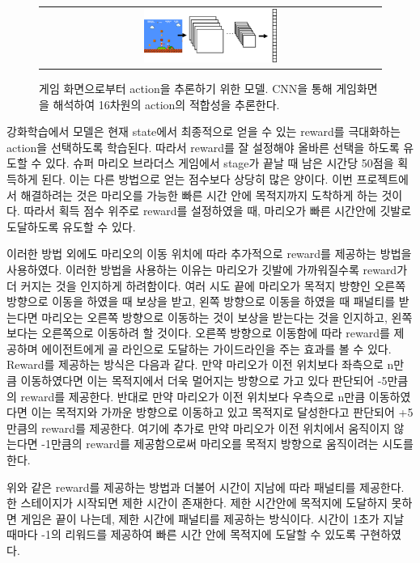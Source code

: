 \begin{figure}[]
\begin{center}
\begin{tabular}{c}
     \includegraphics[width=0.4\textwidth]{FIG/overview.pdf} \\
\end{tabular}
\caption{
	게임 화면으로부터 action을 추론하기 위한 모델. CNN을 통해 게임화면을 해석하여 16차원의 action의 적합성을 추론한다.
}
\label{fig:overview}
\end{center}
\end{figure}

강화학습에서 모델은 현재 state에서 최종적으로 얻을 수 있는 reward를 극대화하는 action을 선택하도록 학습된다.
따라서 reward를 잘 설정해야 올바른 선택을 하도록 유도할 수 있다.
슈퍼 마리오 브라더스 게임에서 stage가 끝날 때 남은 시간당 50점을 획득하게 된다.
이는 다른 방법으로 얻는 점수보다 상당히 많은 양이다.
이번 프로젝트에서 해결하려는 것은 마리오를 가능한 빠른 시간 안에 목적지까지 도착하게 하는 것이다. 
따라서 획득 점수 위주로 reward를 설정하였을 때, 마리오가 빠른 시간안에 깃발로 도달하도록 유도할 수 있다.




이러한 방법 외에도 마리오의 이동 위치에 따라 추가적으로 reward를 제공하는 방법을 사용하였다. 
이러한 방법을 사용하는 이유는 마리오가 깃발에 가까워질수록 reward가 더 커지는 것을 인지하게 하려함이다. 
여러 시도 끝에 마리오가 목적지 방향인 오른쪽 방향으로 이동을 하였을 때 보상을 받고, 왼쪽 방향으로 이동을 하였을 때 패널티를 받는다면 마리오는 오른쪽 방향으로 이동하는 것이 보상을 받는다는 것을 인지하고, 왼쪽보다는 오른쪽으로 이동하려 할 것이다.
오른쪽 방향으로 이동함에 따라 reward를 제공하며 에이전트에게 골 라인으로 도달하는 가이드라인을 주는 효과를 볼 수 있다.
Reward를 제공하는 방식은 다음과 같다.
만약 마리오가 이전 위치보다 좌측으로 n만큼 이동하였다면 이는 목적지에서 더욱 멀어지는 방향으로 가고 있다 판단되어 -5만큼의 reward를 제공한다. 
반대로 만약 마리오가 이전 위치보다 우측으로 n만큼 이동하였다면 이는 목적지와 가까운 방향으로 이동하고 있고 목적지로 달성한다고 판단되어 +5만큼의 reward를 제공한다.
여기에 추가로 만약 마리오가 이전 위치에서 움직이지 않는다면 -1만큼의 reward를 제공함으로써 마리오를 목적지 방향으로 움직이려는 시도를 한다. 

위와 같은 reward를 제공하는 방법과 더불어 시간이 지남에 따라 패널티를 제공한다. 
한 스테이지가 시작되면 제한 시간이 존재한다. 
제한 시간안에 목적지에 도달하지 못하면 게임은 끝이 나는데, 제한 시간에 패널티를 제공하는 방식이다. 
시간이 1초가 지날 때마다 -1의 리워드를 제공하여 빠른 시간 안에 목적지에 도달할 수 있도록 구현하였다. 

